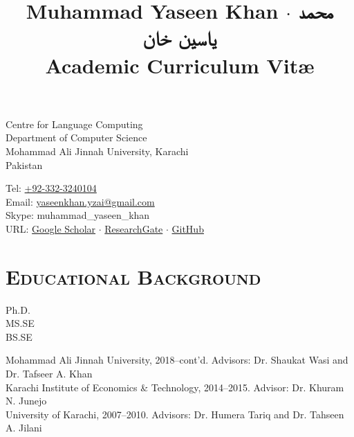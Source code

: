 \documentclass[a4paper, 10pt]{article}
\title{{\Huge\bf Muhammad Yaseen Khan} $\cdot$ {\huge\bf\texturdu{محمد یاسین خان}}\\\small Academic Curriculum Vit\ae}
\author{}
\date{}
\begin{document}
\maketitle
\vspace{-3em}
\begin{minipage}{0.45\textwidth}
Centre for Language Computing\\
Department of Computer Science\\
Mohammad Ali Jinnah University, Karachi\\
Pakistan
\end{minipage}
\hfill
\begin{minipage}{0.45\textwidth}
Tel: \href{tel:+923323240104}{+92-332-3240104}\\
Email: \href{mailto:yaseenkhan.yzai@gmail.com}{yaseenkhan.yzai@gmail.com}\\
Skype: muhammad\_yaseen\_khan\\
URL: \href{https://scholar.google.com/citations?user=a_d2KTEAAAAJ&hl=en}{Google Scholar} $\cdot$ \href{https://www.researchgate.net/profile/Muhammad_Yaseen_Khan}{ResearchGate} $\cdot$ \href{https://www.github.com/MuhammadYaseenKhan}{GitHub}
\end{minipage}


\section*{\normalfont\textsc{Educational Background}}
\hfill\begin{minipage}{0.09\textwidth}
Ph.D.\\
MS.SE\\
BS.SE
\end{minipage}%
\begin{minipage}{0.89\textwidth}
Mohammad Ali Jinnah University, 2018--cont'd. 
Advisors: Dr. Shaukat Wasi and Dr. Tafseer A. Khan\\
Karachi Institute of Economics \& Technology, 2014--2015. Advisor: Dr. Khuram N. Junejo\\
University of Karachi, 2007--2010. Advisors: Dr. Humera Tariq and Dr. Tahseen A. Jilani
\end{minipage}

\end{document}
